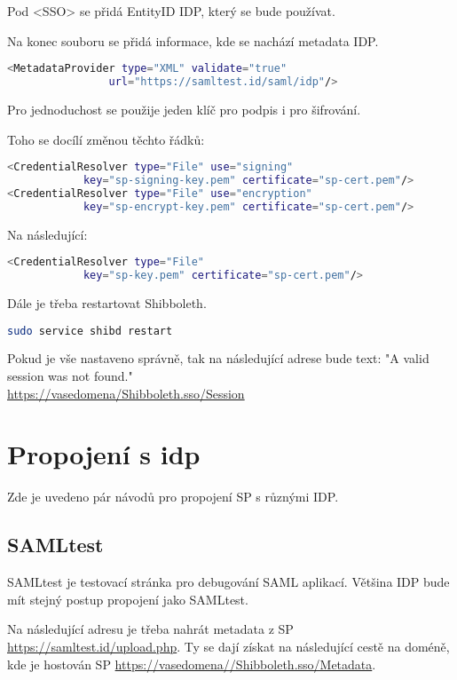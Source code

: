 Pod <SSO> se přidá EntityID IDP, který se bude používat.

Na konec souboru se přidá informace, kde se nachází metadata IDP.
\begin{lstlisting}[language=Bash]
 <MetadataProvider type="XML" validate="true"
                url="https://samltest.id/saml/idp"/>
\end{lstlisting}

Pro jednoduchost se použije jeden klíč pro podpis i pro šifrování.

Toho se docílí změnou těchto řádků:
\begin{lstlisting}[language=Bash]
<CredentialResolver type="File" use="signing"
            key="sp-signing-key.pem" certificate="sp-cert.pem"/>
<CredentialResolver type="File" use="encryption"
            key="sp-encrypt-key.pem" certificate="sp-cert.pem"/>
\end{lstlisting}

Na následující:
\begin{lstlisting}[language=Bash]
<CredentialResolver type="File"
            key="sp-key.pem" certificate="sp-cert.pem"/>
\end{lstlisting}

Dále je třeba restartovat Shibboleth.
\begin{lstlisting}[language=Bash]
sudo service shibd restart
\end{lstlisting}

Pokud je vše nastaveno správně, tak na následující adrese bude text: "A valid session was not found."\\
\url{https://vasedomena/Shibboleth.sso/Session}

\section{Propojení s idp}

Zde je uvedeno pár návodů pro propojení SP s různými IDP.

\subsection{SAMLtest}
SAMLtest je testovací stránka pro debugování SAML aplikací. Většina IDP bude mít stejný postup propojení jako SAMLtest.



Na následující adresu je třeba nahrát metadata z SP 
\url{https://samltest.id/upload.php}. Ty se dají získat na následující cestě na doméně, kde je hostován SP \url{https://vasedomena//Shibboleth.sso/Metadata}.


